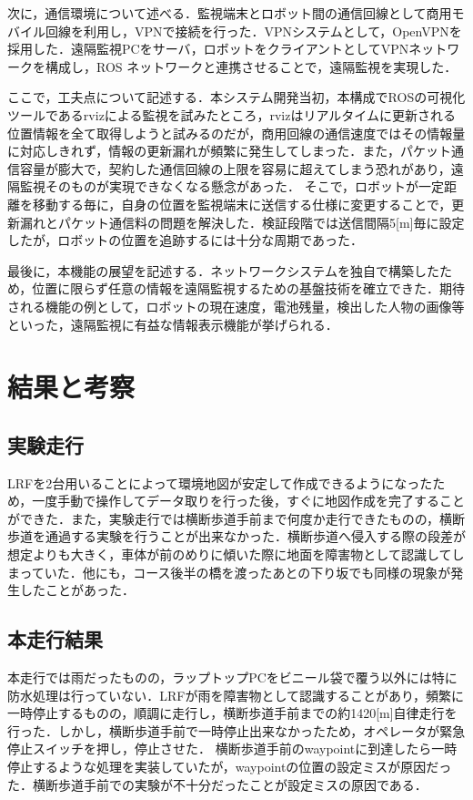 \documentclass[10pt,a4paper]{jarticle}
\begin{document}
次に，通信環境について述べる．監視端末とロボット間の通信回線として商用モバイル回線を利用し，VPNで接続を行った．VPNシステムとして，OpenVPNを採用した．遠隔監視PCをサーバ，ロボットをクライアントとしてVPNネットワークを構成し，ROS ネットワークと連携させることで，遠隔監視を実現した．

ここで，工夫点について記述する．本システム開発当初，本構成でROSの可視化ツールであるrvizによる監視を試みたところ，rvizはリアルタイムに更新される位置情報を全て取得しようと試みるのだが，商用回線の通信速度ではその情報量に対応しきれず，情報の更新漏れが頻繁に発生してしまった．また，パケット通信容量が膨大で，契約した通信回線の上限を容易に超えてしまう恐れがあり，遠隔監視そのものが実現できなくなる懸念があった．
そこで，ロボットが一定距離を移動する毎に，自身の位置を監視端末に送信する仕様に変更することで，更新漏れとパケット通信料の問題を解決した．検証段階では送信間隔5[m]毎に設定したが，ロボットの位置を追跡するには十分な周期であった．

最後に，本機能の展望を記述する．ネットワークシステムを独自で構築したため，位置に限らず任意の情報を遠隔監視するための基盤技術を確立できた．期待される機能の例として，ロボットの現在速度，電池残量，検出した人物の画像等といった，遠隔監視に有益な情報表示機能が挙げられる．

\section{結果と考察}
\subsection{実験走行}
LRFを2台用いることによって環境地図が安定して作成できるようになったため，一度手動で操作してデータ取りを行った後，すぐに地図作成を完了することができた．また，実験走行では横断歩道手前まで何度か走行できたものの，横断歩道を通過する実験を行うことが出来なかった．横断歩道へ侵入する際の段差が想定よりも大きく，車体が前のめりに傾いた際に地面を障害物として認識してしまっていた．他にも，コース後半の橋を渡ったあとの下り坂でも同様の現象が発生したことがあった．

\subsection{本走行結果}
本走行では雨だったものの，ラップトップPCをビニール袋で覆う以外には特に防水処理は行っていない．LRFが雨を障害物として認識することがあり，頻繁に一時停止するものの，順調に走行し，横断歩道手前までの約1420[m]自律走行を行った．しかし，横断歩道手前で一時停止出来なかったため，オペレータが緊急停止スイッチを押し，停止させた．
横断歩道手前のwaypointに到達したら一時停止するような処理を実装していたが，waypointの位置の設定ミスが原因だった．横断歩道手前での実験が不十分だったことが設定ミスの原因である．
\end{document}
